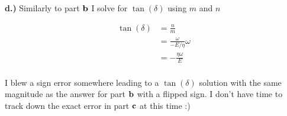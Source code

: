 \textbf{d.)} Similarly to part $\bf{b}$ I solve for $\tan{(\delta)}$ using $m$ and $n$

\begin{align*}
    \tan{(\delta)} &= \frac{n}{m} \\
    &= \frac{\omega}{-E/\eta}{\omega} \\
    &= -\frac{\eta \omega}{E} \\
\end{align*}

I blew a sign error somewhere leading to a $\tan{(\delta)}$ solution with the same magnitude as the answer for part $\bf{b}$ with a flipped sign. I don't have time to track down the exact error in part $\bf{c}$ at this time :)